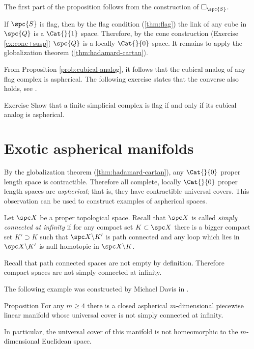 The first part of the proposition follows 
from the construction of $\square_{\spc{S}}$.

If ${\spc{S}}$ is flag, 
then by the flag condition (\ref{thm:flag}) 
the link of any cube in $\spc{Q}$ is a $\Cat{}{1}$ space.
Therefore, by the cone construction (Exercise \ref{ex:cone+susp})
$\spc{Q}$
is a locally $\Cat{}{0}$ space.
It remains to apply the globalization theorem 
(\ref{thm:hadamard-cartan}).
\qeds

From Proposition \ref{prob:cubical-analog}, 
it follows that the cubical analog
of any flag complex is aspherical.
The following exercise states that the  converse also holds, see \cite[5.4]{davis-survey}.

\begin{thm}{Exercise}\label{ex:flag-aspherical}
Show that a finite simplicial complex is flag 
if and only if its cubical analog is aspherical.
\end{thm}

\section{Exotic aspherical manifolds}


By the globalization theorem (\ref{thm:hadamard-cartan}),
any $\Cat{}{0}$ proper length space is contractible.
Therefore all complete, locally $\Cat{}{0}$ proper length spaces 
are \emph{aspherical};
that is, they have contractible universal covers.
This observation can be used to construct examples of aspherical spaces. 

Let $\spc X$ be a proper topological space.
Recall that $\spc X$ is called 
\emph{simply connected at infinity} 
if for any compact set $K\subset\spc X$
there is a bigger compact set $K'\supset K$
such that  $\spc X\backslash K'$ is path connected 
and any loop which lies in $\spc X\backslash K'$
is null-homotopic in  $\spc X\backslash K$.

Recall that path connected spaces are not empty by definition.
Therefore compact spaces are not simply connected at infinity.

The following example was constructed by Michael 
Davis in \cite{davis-noneuclidean}.

\begin{thm}{Proposition}\label{prop:aspherical}
For any  $m\ge 4$ there is a closed aspherical 
$m$-dimensional piecewise linear manifold
whose universal cover is not simply connected at infinity.

In particular, the universal cover of this manifold 
is not homeomorphic to the $m$-dimensional Euclidean space.
\end{thm}

